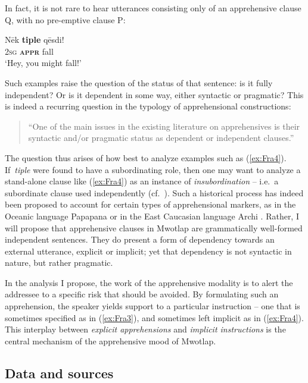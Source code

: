 \documentclass[output=paper,colorlinks,citecolor=brown]{langscibook}
\begin{document}
In fact, it is not rare to hear utterances consisting only of an apprehensive clause Q, with no pre-emptive clause P:
 
\ea \label{ex:Fra4}
\gll Nēk \textbf{tiple} qēsdi! \\
\textsc{2sg} \textsc{\textbf{appr}} fall \\
 `Hey, you might fall!'
\z

 Such examples raise the question of the status of that sentence: is it fully independent? Or is it dependent in some way, either syntactic or pragmatic? This is indeed a recurring question in the typology of apprehensional constructions:

\begin{quote}
    ``One of the main issues in the existing literature on apprehensives is their syntactic and/or pragmatic status as dependent or independent clauses.'' \citep[428]{smithdennis2021}
\end{quote}

The question thus arises of how best to analyze examples such as (\ref{ex:Fra4}). If~\textit{tiple} were found to have a subordinating role, then one may want to analyze a stand-alone clause like (\ref{ex:Fra4}) as an instance of \textit{insubordination} -- i.e.\ a subordinate clause used independently (cf.\ \citealt{evans_insubordination_2007}). Such a historical process has indeed been proposed to account for certain types of apprehensional markers, as in the Oceanic language Papapana \citep{smithdennis2021} or in the East Caucasian language Archi \citep{chapters/daniel}. Rather, I will propose that apprehensive clauses in Mwotlap are grammatically well-formed independent sentences. They do present a form of dependency towards an external utterance, explicit or implicit; yet that dependency is not syntactic in nature, but rather pragmatic.

In the analysis I propose, the work of the apprehensive modality is to alert the addressee to a specific risk that should be avoided. By formulating such an apprehension, the speaker yields support to a particular instruction -- one that is sometimes specified as in (\ref{ex:Fra3}), and sometimes left implicit as in (\ref{ex:Fra4}). This interplay between \textit{explicit apprehensions} and \textit{implicit instructions} is the central mechanism of the apprehensive mood of Mwotlap.



\subsection{Data and sources}
\label{subsec:dataandsources}
\end{document}
